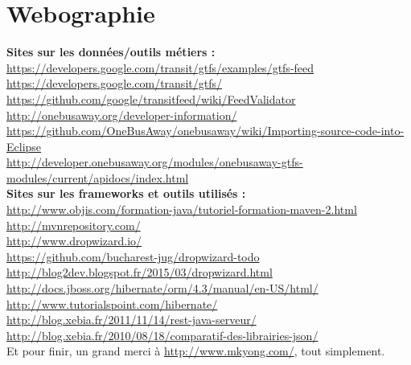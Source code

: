 \chapter*{Webographie}
\label{Bibliographie}


\textbf{Sites sur les données/outils \og métiers \fg :}\label{OBA}\\


\url{https://developers.google.com/transit/gtfs/examples/gtfs-feed}\\

\url{https://developers.google.com/transit/gtfs/}\\

\url{https://github.com/google/transitfeed/wiki/FeedValidator}\\

\url{http://onebusaway.org/developer-information/}\\

\url{https://github.com/OneBusAway/onebusaway/wiki/Importing-source-code-into-Eclipse}\\

\url{http://developer.onebusaway.org/modules/onebusaway-gtfs-modules/current/apidocs/index.html}\\


\textbf{Sites sur les frameworks et outils utilisés :}\\


\url{http://www.objis.com/formation-java/tutoriel-formation-maven-2.html}\\

\url{http://mvnrepository.com/}\\

\url{http://www.dropwizard.io/}\\

\url{https://github.com/bucharest-jug/dropwizard-todo}\\

\url{http://blog2dev.blogspot.fr/2015/03/dropwizard.html}\\

\url{http://docs.jboss.org/hibernate/orm/4.3/manual/en-US/html/}\\

\url{http://www.tutorialspoint.com/hibernate/}\\

\url{http://blog.xebia.fr/2011/11/14/rest-java-serveur/}\\

\url{http://blog.xebia.fr/2010/08/18/comparatif-des-librairies-json/}\\


Et pour finir, un grand merci à \url{http://www.mkyong.com/}, tout simplement.
